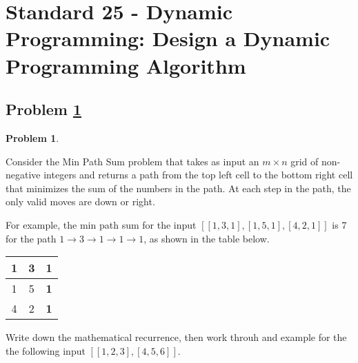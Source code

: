\documentclass[11pt]{article}
\theoremstyle{definition}
\theoremstyle{definition}
\newtheorem{required}{Problem}
\theoremstyle{definition}
\begin{document}
\section{Standard 25 - Dynamic Programming: Design a Dynamic Programming Algorithm}
\subsection{Problem \ref{prob}}\begin{required}\label{prob}

   
Consider the Min Path Sum problem that takes as input an $m \times n$ grid of non-negative integers and returns a path from the top left cell to the bottom right cell that minimizes the sum of the numbers in the path. At each step in the path, the only valid moves are down or right.

For example, the min path sum for the input $[[1,3,1],[1,5,1],[4,2,1]]$ is 7 for the path 
$1\rightarrow 3\rightarrow 1\rightarrow 1\rightarrow 1$, as shown in the table below.

\begin{center}
\begin{tabular}{|c|c|c|}
\hline
    {\bf 1} & {\bf 3} & {\bf 1} \\
\hline
    1 & 5 & {\bf 1} \\
\hline
    4 & 2 & {\bf 1} \\
\hline
\end{tabular}
\end{center}

Write down the mathematical recurrence, then work throuh and example for the the following input $[[1,2,3],[4,5,6]]$.


\end{required}

\end{document}
